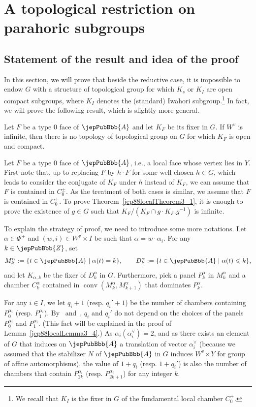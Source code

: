 \section{A topological restriction on parahoric subgroups}
\subsection{Statement of the result and idea of the proof}
In this section, we will prove that beside the reductive case, it is impossible to endow $G$ with a structure of topological group for which $K_s$ or $K_I$ are open compact subgroups, where $K_I$ denotes the (standard) Iwahori subgroup.\footnote{We recall that $K_I$ is the fixer in $G$ of the fundamental local chamber $C_0^+$.} In fact, we will prove the following result, which is slightly more general.
\begin{theorem}\label{jep88localTheorem3_1}
Let $F$ be a type $0$ face of $\jepPubBbb{A}$ and let $K_F$ be its fixer in $G$. If $W^v$ is infinite, then there is no topology of topological group on $G$ for which $K_F$ is open and compact.
\end{theorem}
Let $F$ be a type $0$ face of $\jepPubBbb{A}$, i.e., a local face whose vertex lies in $Y$. First note that, up to replacing $F$ by $h\cdot F$ for some well-chosen $h\in G$, which leads to consider the conjugate of $K_F$ under $h$ instead of $K_F$, we can assume that $F$ is contained in $C_0^\pm$. As the treatment of both cases is similar, we assume that $F$ is contained in $C_0^+$. To prove Theorem~\ref{jep88localTheorem3_1}, it is enough to prove the existence of $g\in G$ such that $K_F/(K_F\cap g\cdot K_F.g^{-1})$ is infinite.

To explain the strategy of proof, we need to introduce some more notations. Let $\alpha\in\Phi^+$ and $(w,i)\in W^v\times I$ be such that $\alpha=w\cdot\alpha_i$. For any $k\in\jepPubBbb{Z}$, set
\[
M_k^\alpha:=\{t\in\jepPubBbb{A}\mid\alpha(t)=k\},\qquad D_k^\alpha:=\{t\in\jepPubBbb{A}\mid\alpha(t)\leqslant k\},
\]
and let $K_{\alpha,k}$ be the fixer of $D_k^\alpha$ in $G$. Furthermore, pick a panel $P_k^\alpha$ in $M_k^\alpha$ and a chamber $C_k^\alpha$ contained in $\operatorname{conv}(M_k^\alpha,M_{k+1}^\alpha)$ that dominates $P_k^\alpha$.

For any $i\in I$, we let $q_i+1$ (resp. $q_i'+1$) be the number of chambers containing $P_0^{\alpha_i}$ (resp. $P_1^{\alpha_i}$). By~\cite[Prop.~2.9]{jep88refRou11} and~\cite[Lem.~3.2]{jep88refHeb16}, $q_i$ and $q_i'$ do not depend on the choices of the panels $P_0^{\alpha_i}$ and $P_1^{\alpha_i}$. (This fact will be explained in the proof of Lemma~\ref{jep88localLemma3_4}.) As $\alpha_i(\alpha_i^{\scriptscriptstyle\vee})=2$, and as there exists an element of $G$ that induces on $\jepPubBbb{A}$ a translation of vector $\alpha_i^{\scriptscriptstyle\vee}$ (because we assumed that the stabilizer $N$ of $\jepPubBbb{A}$ in $G$ induces $W^v\ltimes Y$ for group of affine automorphisms), the value of $1+q_i$ (resp. $1+q_i'$) is also the number of chambers that contain $P_{2k}^{\alpha_i}$ (resp. $P_{2k+1}^{\alpha_i}$) for any integer $k$.

